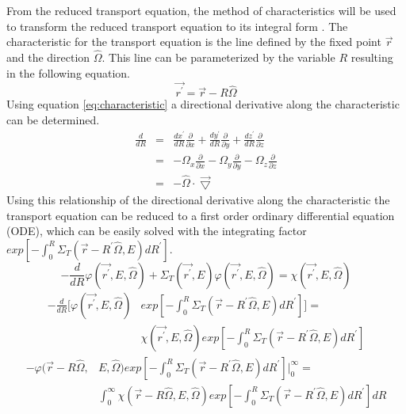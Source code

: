 From the reduced transport equation, the method of characteristics will be 
used to transform the reduced transport equation to its integral form
\citep{lewis+miller}. The characteristic for the transport equation is the line
defined by the fixed point $\vec{r}$ and the direction $\hat{\Omega}$. This 
line can be parameterized by the variable $R$ resulting in the following 
equation. 
\begin{equation}
  \vec{r^{'}} = \vec{r} - R\hat{\Omega}
  \label{eq:characteristic}
\end{equation}
Using equation \ref{eq:characteristic} a directional derivative along the
characteristic can be determined.
\begin{eqnarray}
  \frac{d}{dR} & = & \frac{dx^{'}}{dR}\frac{\partial}{\partial x} +
  \frac{dy^{'}}{dR}\frac{\partial}{\partial y} +
  \frac{dz^{'}}{dR}\frac{\partial}{\partial z} \nonumber \\
  & = & -\Omega_x \frac{\partial}{\partial x} -
  \Omega_y \frac{\partial}{\partial y} -
  \Omega_z \frac{\partial}{\partial z} \nonumber \\
  & = & -\hat{\Omega} \cdot \vec{\bigtriangledown}
\end{eqnarray}
Using this relationship of the directional derivative along the characteristic
the transport equation can be reduced to a first order ordinary differential 
equation (ODE), which can be easily solved with the integrating factor
$exp\left[-\int_0^R \Sigma_T(\vec{r}-R^{'}\hat{\Omega},E)dR^{'} \right]$.
\begin{equation*}
  -\frac{d}{dR}\varphi(\vec{r^{'}},E,\hat{\Omega}) + \Sigma_T(\vec{r^{'}},E)
  \varphi(\vec{r^{'}},E,\hat{\Omega}) = 
  \chi(\vec{r^{'}},E,\hat{\Omega})
\end{equation*}
\begin{equation*}
  \begin{split}
    -\frac{d}{dR}\bigg[\varphi(\vec{r^{'}},E,\hat{\Omega})
      &exp\left[-\int_0^R \Sigma_T(\vec{r}-R^{'}\hat{\Omega},E)dR^{'}\right]
      \bigg] = \\
    & \chi(\vec{r^{'}},E,\hat{\Omega})
    exp\left[-\int_0^R \Sigma_T(\vec{r}-R^{'}\hat{\Omega},E)dR^{'} \right]
  \end{split}
\end{equation*}
\begin{equation*}
  \begin{split}
    -\varphi(\vec{r} - R\hat{\Omega},&E,\hat{\Omega})
    exp\left[-\int_0^R \Sigma_T(\vec{r}-R^{'}\hat{\Omega},E)dR^{'}\right] 
    \bigg|_0^{\infty} = \\
    & \int_0^{\infty} 
    \chi(\vec{r} - R\hat{\Omega},E,\hat{\Omega})
    exp\left[-\int_0^R \Sigma_T(\vec{r}-R^{'}\hat{\Omega},E)dR^{'} \right] dR
  \end{split}
\end{equation*}
